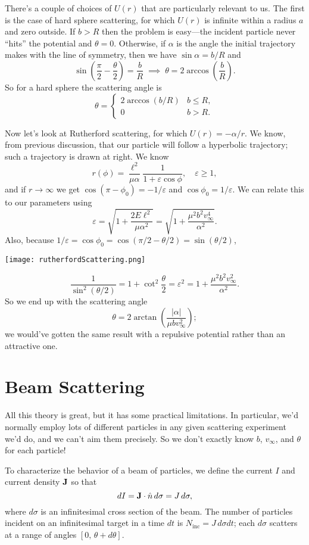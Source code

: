 \documentclass[../p111main.tex]{subfiles}
\begin{document}
There's a couple of choices of $U(r)$ that are particularly relevant to us.
The first is the case of hard sphere scattering, for which $U(r)$ is infinite within a radius $a$ and zero outside.
If $b > R$ then the problem is easy---the incident particle never ``hits'' the potential and $\theta = 0$.
Otherwise, if $\alpha$ is the angle the initial trajectory makes with the line of symmetry, then we have $\sin \alpha = b / R$ and
\[ \sin \left( \frac{\pi}{2} - \frac{\theta}{2} \right) = \frac{b}{R} \;\implies\; \theta = 2 \arccos \left( \frac{b}{R} \right). \]
So for a hard sphere the scattering angle is
\[ \theta = \begin{cases} 2 \arccos (b / R) & b \leq R, \\ 0 & b > R. \end{cases} \]
\parbox{0.6\textwidth}{
    Now let's look at Rutherford scattering, for which $U(r) = -\alpha / r$.
    We know, from previous discussion, that our particle will follow a hyperbolic trajectory; such a trajectory is drawn at right.
    We know
    \[ r(\phi) = \frac{\ell^2}{\mu \alpha} \frac{1}{1 + \varepsilon \cos \phi}, \quad \varepsilon \geq 1, \]
    and if $r \to \infty$ we get $\cos(\pi - \phi_0) = -1 / \varepsilon$ and $\cos \phi_0 = 1 / \varepsilon$.
    We can relate this to our parameters using
    \[ \varepsilon = \sqrt{1 + \frac{2E \ell^2}{\mu \alpha^2}} = \sqrt{1 + \frac{\mu^2 b^2 v_\infty^4}{\alpha^2}}. \]
    Also, because $1 / \varepsilon = \cos \phi_0 = \cos \left( \pi / 2 - \theta / 2 \right) = \sin(\theta / 2)$,
}\parbox{0.4\textwidth}{
    \quad\;
    \texttt{[image: rutherfordScattering.png]}
}

\[ \frac{1}{\sin^2 (\theta / 2)} = 1 + \cot^2 \frac{\theta}{2} = \varepsilon^2 = 1 + \frac{\mu^2 b^2 v_\infty^2}{\alpha^2}. \]
So we end up with the scattering angle
\[ \theta = 2 \arctan \left( \frac{|\alpha|}{\mu b v_\infty^2} \right); \]
we would've gotten the same result with a repulsive potential rather than an attractive one.

\section{Beam Scattering}
All this theory is great, but it has some practical limitations.
In particular, we'd normally employ lots of different particles in any given scattering experiment we'd do, and we can't aim them precisely.
So we don't exactly know $b$, $v_\infty$, and $\theta$ for each particle!

To characterize the behavior of a beam of particles, we define the current $I$ and current density $\mathbf{J}$ so that
\[ dI = \mathbf{J} \cdot \hat n \,d\sigma = J \,d\sigma, \]
where $d\sigma$ is an infinitesimal cross section of the beam.
The number of particles incident on an infinitesimal target in a time $dt$ is $N_\textrm{inc} = J \,d\sigma dt$; each $d\sigma$ scatters at a range of angles $[0, \, \theta + d\theta]$.
\end{document}
